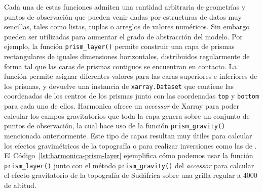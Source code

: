 Cada una de estas funciones admiten una cantidad arbitraria de geometrías
y puntos de observación que pueden venir dadas por estructuras de datos muy
sencillas, tales como listas, tuplas o arreglos de valores numéricos.
Sin embargo pueden ser utilizadas para aumentar el grado de abstracción del
modelo.
Por ejemplo, la función \texttt{prism\_layer()} permite construir una capa de
prismas rectangulares de iguales dimensiones horizontales, distribuidos
regularmente de forma tal que las caras de prismas contiguos se encuentran en
contacto.
La función permite asignar diferentes valores para las caras superiores
e inferiores de los prismas, y devuelve una instancia de
\texttt{xarray.Dataset} que contiene las coordenadas de los centros de los
prismas junto con las coordenadas \texttt{top} y \texttt{bottom} para cada uno
de ellos.
Harmonica ofrece un \emph{accessor} de Xarray para poder calcular los campos
gravitatorios que toda la capa genera sobre un conjunto de puntos de
observación, la cual hace uso de la función \texttt{prism\_gravity()}
mencionada anteriormente.
Este tipo de capas resultan muy útiles para calcular los efectos gravimétricos
de la topografía o para realizar inversiones como las de \citet{uieda2017}.
El Código~\ref{lst:harmonica-prism-layer} ejemplifica cómo podemos usar la
función \texttt{prism\_layer()} junto con el método \texttt{prism\_gravity()}
del \emph{accessor} para calcular el efecto gravitatorio de la topografía de
Sudáfrica sobre una grilla regular a 4000\m{} de altitud.



